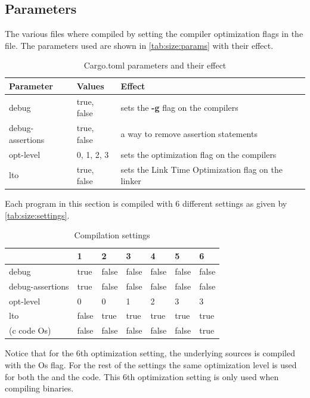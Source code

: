 \subsection{Parameters}
\label{sec:size:params}
The various files where compiled by setting the compiler optimization flags in the  file.
The parameters used are shown in \autoref{tab:size:params} with their effect.

\begin{table}[H]
  \centering
  \begin{tabular}{l|l|l}

    \textbf{Parameter} & \textbf{Values} & \textbf{Effect} \\
    \hline
    debug & true, false & sets the \textbf{-g} flag on the compilers  \\
    debug-assertions & true, false & a way to remove assertion statements \\
    opt-level & 0, 1, 2, 3 & sets the optimization flag on the compilers \\
    lto & true, false & sets the Link Time Optimization flag on the linker \\
    \hline
  \end{tabular}
  \caption{Cargo.toml parameters and their effect}
  \label{tab:size:params}
\end{table}

Each program in this section is compiled with 6 different settings as given by \autoref{tab:size:settings}.
\begin{table}[H]
  \centering
  \begin{tabular}{l|l|l|l|l|l|l}
    & \textbf{1} & \textbf{2} & \textbf{3} & \textbf{4} & \textbf{5} & \textbf{6} \\
    \hline
    debug            & true  & false & false & false & false & false \\
    debug-assertions & true  & false & false & false & false & false \\
    opt-level        & 0     & 0     & 1     & 2     & 3     & 3     \\
    lto              & false & true  & true  & true  & true  & true  \\
    (c code Os)      & false & false & false & false & false & true \\
    \hline
  \end{tabular}
  \caption{Compilation settings}
  \label{tab:size:settings}
\end{table}

Notice that for the 6th optimization setting, the underlying {\C} sources is compiled with the Os flag.
For the rest of the settings the same optimization level is used for both the {\rust} and the {\C} code.
This 6th optimization setting is only used when compiling binaries.

